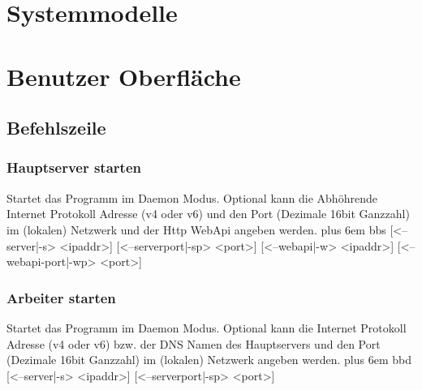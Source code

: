 \documentclass[a4paper,12pt]{article}
\makeatletter
\newenvironment{mycode}
 {\def\@xobeysp{\ }\verbatim\rightskip=0pt plus 6em\relax}
 {\endverbatim}
\makeatother
\begin{document}





\section{Systemmodelle}


\section{Benutzer Oberfläche}
\subsection{Befehlszeile}

\subsubsection{Hauptserver starten}
Startet das Programm im \gls{Daemon} Modus. Optional kann die Abhöhrende Internet Protokoll Adresse (v4 oder v6) und den Port (Dezimale 16bit Ganzzahl) im (lokalen) Netzwerk und der Http WebApi angeben werden.
\begin{mycode}
bbs [<--server|-s> <ipaddr>] [<--serverport|-sp> <port>] [<--webapi|-w> <ipaddr>] [<--webapi-port|-wp> <port>]
\end{mycode}

\subsubsection{Arbeiter starten}
Startet das Programm im \gls{Daemon} Modus. Optional kann die Internet Protokoll Adresse (v4 oder v6) bzw. der DNS Namen des Hauptservers und den Port (Dezimale 16bit Ganzzahl) im (lokalen) Netzwerk angeben werden.
\begin{mycode}
bbd [<--server|-s> <ipaddr>] [<--serverport|-sp> <port>]
\end{mycode}
\end{document}
